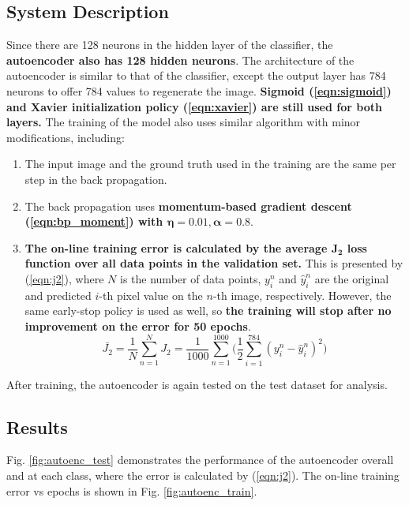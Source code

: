 \documentclass[11pt,titlepage]{article}
\begin{document}
\subsection{System Description}

Since there are 128 neurons in the hidden layer of the classifier, the \textbf{autoencoder also has 128 hidden neurons}. The architecture of the autoencoder is similar to that of the classifier, except the output layer has 784 neurons to offer 784 values to regenerate the image. \textbf{Sigmoid (\ref{eqn:sigmoid}) and Xavier initialization policy (\ref{eqn:xavier}) are still used for both layers.} The training of the model also uses similar algorithm with minor modifications, including:
\begin{enumerate}[label=\alph*.]
	\item The input image and the ground truth used in the training are the same per step in the back propagation. 
	
	\item The back propagation uses \textbf{momentum-based gradient descent (\ref{eqn:bp_moment}) with $\boldsymbol{\eta = 0.01, \alpha = 0.8}$}.
	
	\item \textbf{The on-line training error is calculated by the average $\boldsymbol{J_2}$ loss function over all data points in the validation set.} This is presented by (\ref{eqn:j2}), where $N$ is the number of data points, $y_i^n$ and $\hat{y}_i^n$ are the original and predicted $i$-th pixel value on the $n$-th image, respectively. However, the same early-stop policy is used as well, so \textbf{the training will stop after no improvement on the error for 50 epochs}.
	\begin{equation}
		\bar{J_2} = \frac{1}{N} \sum_{n=1}^{N} J_2 = \frac{1}{1000} \sum_{n=1}^{1000} \bigg( \frac{1}{2} \sum_{i=1}^{784} (y_i^n - \hat{y}_i^n)^2 \bigg)
		\label{eqn:j2}
	\end{equation}
	
\end{enumerate} 

After training, the autoencoder is again tested on the test dataset for analysis.

\subsection{Results}
Fig. \ref{fig:autoenc_test} demonstrates the performance of the autoencoder overall and at each class, where the error is calculated by (\ref{eqn:j2}). The on-line training error vs epochs is shown in Fig. \ref{fig:autoenc_train}. 
\end{document}
